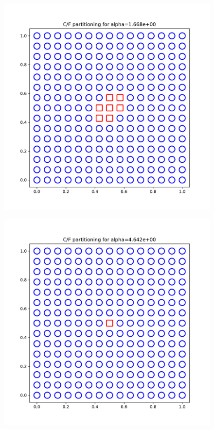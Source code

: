 \documentclass{article}
\begin{document}
\begin{figure}[h]
  \includegraphics[width=\textwidth]{figures/cf_11.pdf}
\end{figure}

\begin{figure}[h]
  \includegraphics[width=\textwidth]{figures/cf_12.pdf}
\end{figure}
\end{document}
